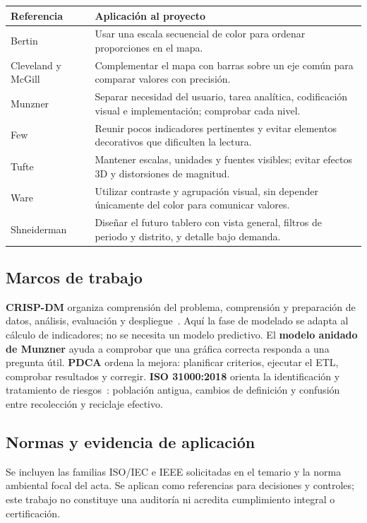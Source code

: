 \documentclass[10pt,a4paper]{article}
\begin{document}
\begin{center}\small
\begin{tabularx}{\linewidth}{@{}p{3.7cm}Y@{}}
\toprule
\textbf{Referencia} & \textbf{Aplicación al proyecto} \\\midrule
Bertin~\cite{bertin} & Usar una escala secuencial de color para ordenar proporciones en el mapa. \\
Cleveland y McGill~\cite{cleveland} & Complementar el mapa con barras sobre un eje común para comparar valores con precisión. \\
Munzner~\cite{munzner} & Separar necesidad del usuario, tarea analítica, codificación visual e implementación; comprobar cada nivel. \\
Few~\cite{few} & Reunir pocos indicadores pertinentes y evitar elementos decorativos que dificulten la lectura. \\
Tufte~\cite{tufte} & Mantener escalas, unidades y fuentes visibles; evitar efectos 3D y distorsiones de magnitud. \\
Ware~\cite{ware} & Utilizar contraste y agrupación visual, sin depender únicamente del color para comunicar valores. \\
Shneiderman~\cite{shneiderman} & Diseñar el futuro tablero con vista general, filtros de periodo y distrito, y detalle bajo demanda. \\
\bottomrule
\end{tabularx}\end{center}

\subsection{Marcos de trabajo}
\textbf{CRISP-DM} organiza comprensión del problema, comprensión y preparación de datos, análisis, evaluación y despliegue~\cite{crisp}. Aquí la fase de modelado se adapta al cálculo de indicadores; no se necesita un modelo predictivo. El \textbf{modelo anidado de Munzner} ayuda a comprobar que una gráfica correcta responda a una pregunta útil. \textbf{PDCA} ordena la mejora: planificar criterios, ejecutar el ETL, comprobar resultados y corregir. \textbf{ISO 31000:2018} orienta la identificación y tratamiento de riesgos~\cite{risk}: población antigua, cambios de definición y confusión entre recolección y reciclaje efectivo.

\newpage
\subsection{Normas y evidencia de aplicación}
Se incluyen las familias ISO/IEC e IEEE solicitadas en el temario y la norma ambiental focal del acta. Se aplican como referencias para decisiones y controles; este trabajo no constituye una auditoría ni acredita cumplimiento integral o certificación.
\end{document}
